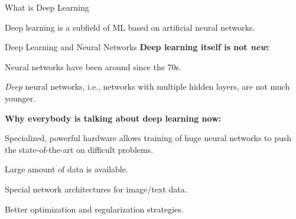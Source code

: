 \documentclass[11pt,compress,t,notes=noshow, xcolor=table]{beamer}
\begin{document}


\begin{framei}{What is Deep Learning}
\item Deep learning is a subfield of ML based on artificial neural networks.
\end{framei}


\begin{frame}{Deep Learning and Neural Networks}
\textbf{Deep learning itself is not \textit{new}:}
\begin{itemizeM}
\item Neural networks have been around since the 70s.
\item \textit{Deep} neural networks, i.e., networks with multiple hidden layers, are not much younger.
\end{itemizeM}
\textbf{Why everybody is talking about deep learning now:}
\begin{itemizeM}
\item Specialized, powerful hardware allows training of huge neural networks to push the state-of-the-art on difficult problems.
\item Large amount of data is available.
\item Special network architectures for image/text data.
\item Better optimization and regularization strategies.
\end{itemizeM}
\end{frame}
\end{document}
